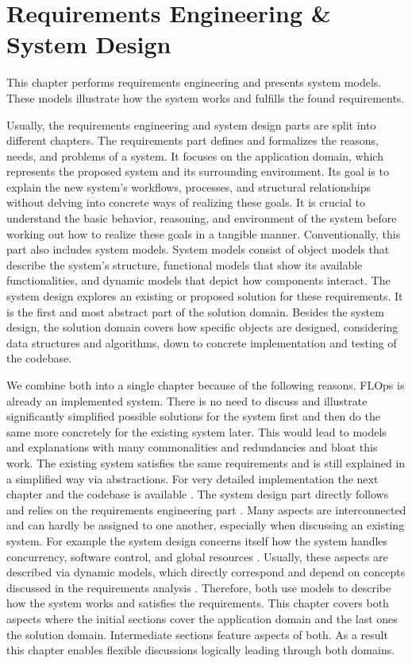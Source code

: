 \chapter{Requirements Engineering \& System Design}

This chapter performs requirements engineering and presents system models.
These models illustrate how the system works and fulfills the found requirements.

Usually, the requirements engineering and system design parts are split into different chapters.
The requirements part defines and formalizes the reasons, needs, and problems of a system.
It focuses on the application domain, which represents the proposed system and its surrounding environment.
Its goal is to explain the new system's workflows, processes, and structural relationships without delving into concrete ways of realizing these goals.
It is crucial to understand the basic behavior, reasoning, and environment of the system before working out how to realize these goals in a tangible manner.
Conventionally, this part also includes system models.
System models consist of object models that describe the system's structure, functional models that show its available functionalities, and dynamic models that depict how components interact.
The system design explores an existing or proposed solution for these requirements.
It is the first and most abstract part of the solution domain.
Besides the system design, the solution domain covers how specific objects are designed, considering data structures and algorithms, down to concrete implementation and testing of the codebase. \cite{book:bruegge}

We combine both into a single chapter because of the following reasons.
FLOps is already an implemented system.
There is no need to discuss and illustrate significantly simplified possible solutions for the system first and then do the same more concretely for the existing system later.
This would lead to models and explanations with many commonalities and redundancies and bloat this work.
The existing system satisfies the same requirements and is still explained in a simplified way via abstractions.
For very detailed implementation the next chapter and the codebase is available \cite{flops_code}.
The system design part directly follows and relies on the requirements engineering part \cite{book:bruegge}.
Many aspects are interconnected and can hardly be assigned to one another, especially when discussing an existing system.
For example the system design concerns itself how the system handles concurrency, software control, and global resources \cite{book:bruegge}.
Usually, these aspects are described via dynamic models, which directly correspond and depend on concepts discussed in the requirements analysis \cite{book:bruegge}.
Therefore, both use models to describe how the system works and satisfies the requirements.
This chapter covers both aspects where the initial sections cover the application domain and the last ones the solution domain.
Intermediate sections feature aspects of both. 
As a result this chapter enables flexible discussions logically leading through both domains.






